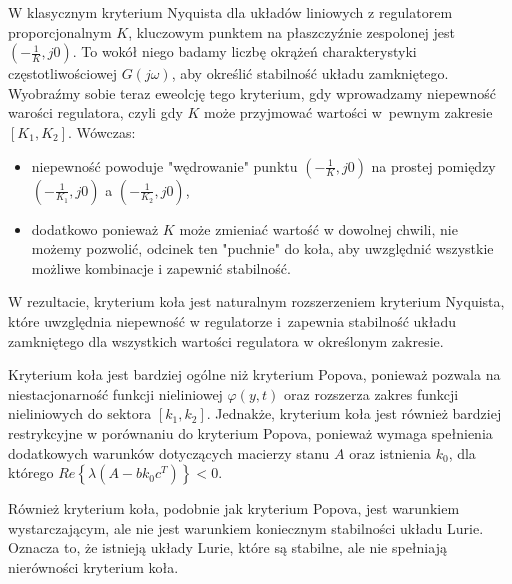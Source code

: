 \documentclass{article}
\begin{document}
    \begin{tcolorbox}[colback=pink!5, colframe=pink!75!black, title=Intuicja]
        W klasycznym kryterium Nyquista dla układów liniowych z regulatorem
        proporcjonalnym $K$, kluczowym punktem na płaszczyźnie zespolonej jest
        $(-\frac{1}{K},j0)$. To wokół niego badamy liczbę okrążeń charakterystyki
        częstotliwościowej $G(j\omega)$, aby określić stabilność układu
        zamkniętego.
        Wyobraźmy sobie teraz eweolcję tego kryterium, gdy wprowadzamy
        niepewność warości regulatora, czyli gdy $K$ może przyjmować wartości
        w~pewnym zakresie $[K_1, K_2]$. Wówczas:
        \begin{itemize}
            \item niepewność powoduje "wędrowanie" punktu $(-\frac{1}{K},j0)$
            na prostej pomiędzy $(-\frac{1}{K_1},j0)$ a $(-\frac{1}{K_2},j0)$,
            \item dodatkowo ponieważ $K$ może zmieniać wartość w dowolnej
            chwili, nie możemy pozwolić, odcinek ten "puchnie" do koła,
            aby uwzględnić wszystkie możliwe kombinacje i zapewnić stabilność.
        \end{itemize}

        W rezultacie, kryterium koła jest naturalnym rozszerzeniem kryterium
        Nyquista, które uwzględnia niepewność w regulatorze i~zapewnia
        stabilność
        układu zamkniętego dla wszystkich wartości regulatora w określonym
        zakresie.
    \end{tcolorbox}

    \begin{tcolorbox}[colback=orange!5, colframe=orange!75!black, title=Uwaga]
        Kryterium koła jest bardziej ogólne niż kryterium Popova, ponieważ pozwala na niestacjonarność funkcji nieliniowej $\varphi(y,t)$ oraz rozszerza zakres funkcji nieliniowych do sektora $[k_{1}, k_{2}]$.
         Jednakże, kryterium koła jest również bardziej restrykcyjne w porównaniu do kryterium Popova, ponieważ wymaga spełnienia dodatkowych warunków dotyczących macierzy stanu $A$ oraz istnienia $k_{0}$, dla którego $Re\left\{ \lambda(A-bk_{0}c^{T}) \right\} < 0$.
    \end{tcolorbox}

    \begin{tcolorbox}[colback=orange!5, colframe=orange!75!black, title=Uwaga]
        Również kryterium koła, podobnie jak kryterium Popova, jest warunkiem wystarczającym, ale nie jest warunkiem koniecznym stabilności układu Lurie.
        Oznacza to, że istnieją układy Lurie, które są stabilne, ale nie spełniają nierówności kryterium koła.
    \end{tcolorbox}
    
\end{document}
